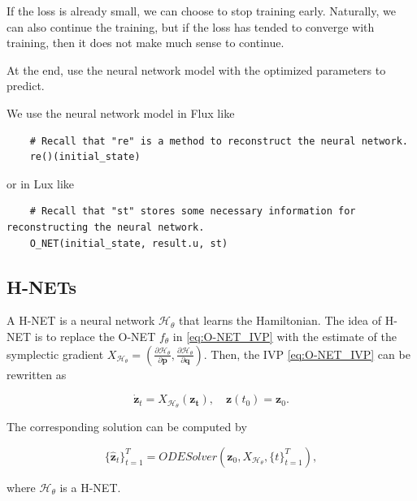 \documentclass[
	parskip, 			   %
	twoside, 			   %
	DIV=14, 			   %
	BCOR=15.0mm, 		   %
	headsepline, 		   %
	open=right, 		   %
	captions=tableheading, %
	bibliography=totoc,    %
	numbers=noenddot       %
]{scrreprt}
\begin{document}
If the loss is already small, we can choose to stop training early. Naturally, we can also continue the training, but if the loss has tended to converge with training, then it does not make much sense to continue.

At the end, use the neural network model with the optimized parameters to predict.

We use the neural network model in Flux like
\begin{verbatim}
    # Recall that "re" is a method to reconstruct the neural network.
    re()(initial_state)
\end{verbatim}

or in Lux like
\begin{verbatim}
    # Recall that "st" stores some necessary information for reconstructing the neural network.
    O_NET(initial_state, result.u, st)
\end{verbatim}


\subsection{H-NETs}
A H-NET is a neural network $\mathcal{H}_{\theta}$ that learns the Hamiltonian. The idea of H-NET is to replace the O-NET $f_{\theta}$ in \ref{eq:O-NET_IVP} with the estimate of the symplectic gradient $X_{\mathcal{H}_{\theta}}=(\frac{\partial \mathcal{H}_{\theta}}{\partial \mathbf{p}}, \frac{\partial \mathcal{H}_{\theta}}{\partial \mathbf{q}})$. Then, the IVP \ref{eq:O-NET_IVP} can be rewritten as

\begin{equation}
    \label{eq:H-NET_IVP}
    \dot{\mathbf{z}}_t = X_{\mathcal{H}_{\theta}}(\mathbf{z_t}), \quad \mathbf{z}(t_{0}) = \mathbf{z}_{0}.
\end{equation}

The corresponding solution can be computed by

\begin{equation}
    \label{eq:H-NET_ODESolver}
     \{ \mathbf{\hat{z}}_{t} \}_{t=1}^{T}  = ODESolver(\mathbf{z}_{0}, X_{\mathcal{H}_{\theta}}, \{ t \}_{t=1}^{T}),
\end{equation}

where $\mathcal{H}_{\theta}$ is a H-NET.
\end{document}
